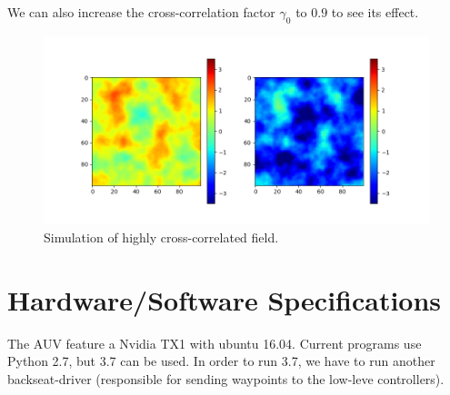 \documentclass[a4paper,10pt]{article}
\begin{document}
We can also increase the cross-correlation factor $\gamma_0$ to $0.9$ to see
its effect.
\begin{figure}[tbh!p]
\centering
\includegraphics[scale=0.65]{images/sample_high_correlation.png}
\caption{Simulation of highly cross-correlated field.}
\end{figure}


\newpage
\section{Hardware/Software Specifications}
The AUV feature a Nvidia TX1 with ubuntu 16.04. Current programs use Python
2.7, but 3.7 can be used.
In order to run 3.7, we have to run
another backseat-driver (responsible for sending waypoints to the low-leve
controllers).
\end{document}
